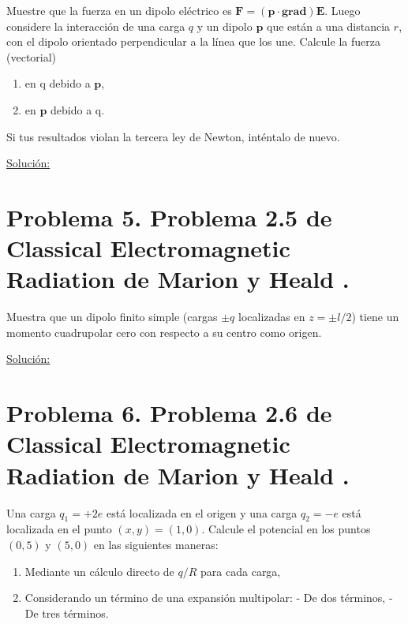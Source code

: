 \documentclass[a4paper,11pt]{article}
\numberwithin{equation}{section}
\begin{document}
Muestre que la fuerza en un dipolo eléctrico es $\mathbf{F} = (\mathbf{p}\cdot 
\mathbf{grad})\mathbf{E}$. Luego considere la interacción de una carga $q$ y un dipolo 
$\mathbf{p}$ que están a una distancia $r$, con el dipolo orientado perpendicular a 
la línea que los une. Calcule la fuerza (vectorial)

\begin{enumerate}[label=\textbf{(\alph*)}]
\item en q debido a $\mathbf{p}$, 
\item en $\mathbf{p}$ debido a q.
\end{enumerate}

Si tus resultados violan la tercera ley de Newton, inténtalo de nuevo.

\vspace{.3cm}

\underline{Solución:} \vspace{.3cm}

\section{Problema 5. Problema 2.5 de Classical Electromagnetic Radiation
de Marion y Heald \cite{marion2}.}

Muestra que un dipolo finito simple (cargas $\pm q$ localizadas en $z = \pm l/2$) 
tiene un momento cuadrupolar cero con respecto a su centro como origen.

\vspace{.3cm}

\underline{Solución:} \vspace{.3cm}

\section{Problema 6. Problema 2.6 de Classical Electromagnetic Radiation
de Marion y Heald \cite{marion2}.}

Una carga $q_1 = + 2e$ está localizada en el origen y una carga $q_2 = - e$ está 
localizada en el punto $(x,y) = (1,0)$. Calcule el potencial en los puntos $(0,5)$
y $(5,0)$ en las siguientes maneras:

\begin{enumerate}[label=\textbf{(\alph*)}]
\item Mediante un cálculo directo de $q/R$ para cada carga,
\item Considerando un término de una expansión multipolar:
\subitem - De dos términos,
\subitem - De tres términos.
\end{enumerate}
\end{document}
